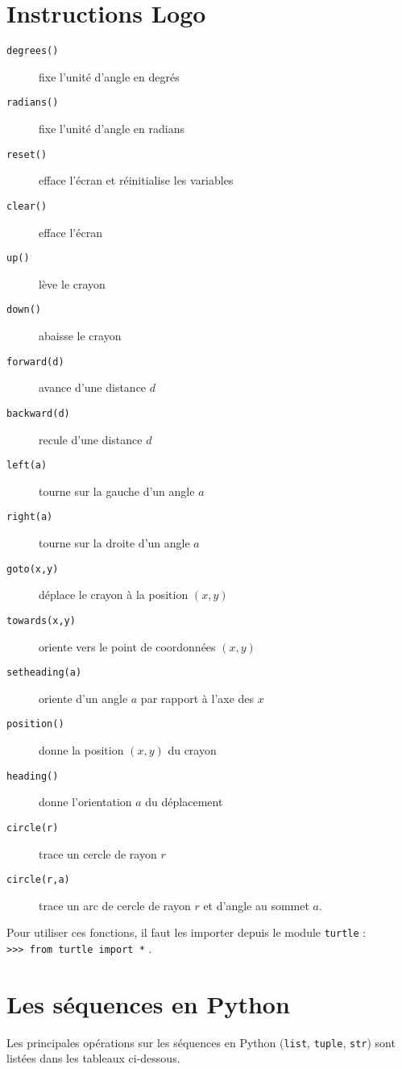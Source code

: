\section{Instructions {\sc Logo}}\label{logo}
{\footnotesize
\begin{description}
\item[\tt degrees()] fixe l'unité d'angle en degrés
\item[\tt radians()] fixe l'unité d'angle en radians
\item[\tt reset()] efface l'écran et réinitialise les variables
\item[\tt clear()] efface l'écran
\item[\tt up()] lève le crayon 
\item[\tt down()] abaisse le crayon 
\item[\tt forward(d)] avance d'une distance $d$
\item[\tt backward(d)] recule d'une distance $d$
\item[\tt left(a)] tourne sur la gauche d'un angle $a$
\item[\tt right(a)] tourne sur la droite d'un angle $a$
\item[\tt goto(x,y)] déplace le crayon à la position $(x,y)$
\item[\tt towards(x,y)] oriente vers le point de coordonnées $(x,y)$
\item[\tt setheading(a)] oriente d'un angle $a$ par rapport à l'axe des $x$
\item[\tt position()] donne la position $(x,y)$ du crayon
\item[\tt heading()] donne l'orientation $a$ du déplacement 
\item[\tt circle(r)] trace un cercle de rayon $r$
\item[\tt circle(r,a)] trace un arc de cercle de rayon $r$ et d'angle au sommet $a$.
\end{description}
}

\noindent Pour utiliser ces fonctions, il faut les importer depuis le module {\tt turtle} :\\
{\tt >>> from turtle import *} .

\section{Les séquences en {\sc Python}}\label{python:listes}
Les principales opérations sur les séquences en {\sc Python} ({\tt list}, 
{\tt tuple}, {\tt str}) sont listées dans les tableaux ci-dessous.


